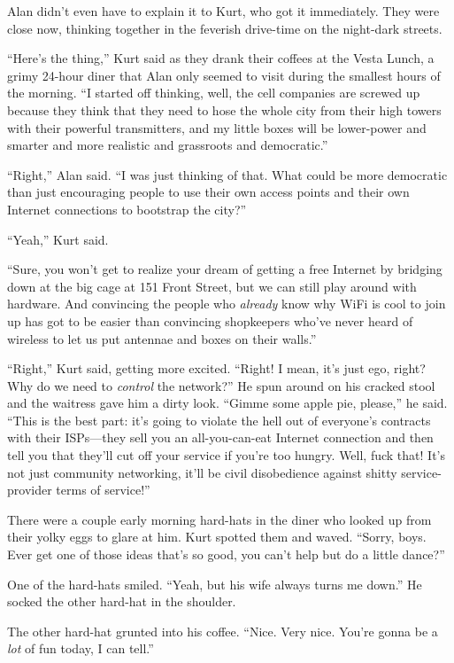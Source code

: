 Alan didn't even have to explain it to Kurt, who got it immediately. 
They were close now, thinking together in the feverish drive-time on
the night-dark streets.

``Here's the thing,'' Kurt said as they drank their coffees at the
Vesta Lunch, a grimy 24-hour diner that Alan only seemed to visit
during the smallest hours of the morning.  ``I started off thinking,
well, the cell companies are screwed up because they think that they
need to hose the whole city from their high towers with their powerful
transmitters, and my little boxes will be lower-power and smarter and
more realistic and grassroots and democratic.''

``Right,'' Alan said.  ``I was just thinking of that.  What could be
more democratic than just encouraging people to use their own access
points and their own Internet connections to bootstrap the city?''

``Yeah,'' Kurt said.

``Sure, you won't get to realize your dream of getting a free Internet
by bridging down at the big cage at 151 Front Street, but we can still
play around with hardware.  And convincing the people who
\textit{already} know why WiFi is cool to join up has got to be easier
than convincing shopkeepers who've never heard of wireless to let us
put antennae and boxes on their walls.''

``Right,'' Kurt said, getting more excited.  ``Right!  I mean, it's
just ego, right?  Why do we need to \textit{control} the network?'' He
spun around on his cracked stool and the waitress gave him a dirty
look.  ``Gimme some apple pie, please,'' he said.  ``This is the best
part:  it's going to violate the hell out of everyone's contracts with
their ISPs---they sell you an all-you-can-eat Internet connection and
then tell you that they'll cut off your service if you're too hungry. 
Well, fuck that!  It's not just community networking, it'll be civil
disobedience against shitty service-provider terms of service!''

There were a couple early morning hard-hats in the diner who looked up
from their yolky eggs to glare at him.  Kurt spotted them and waved. 
``Sorry, boys.  Ever get one of those ideas that's so good, you can't
help but do a little dance?''

One of the hard-hats smiled.  ``Yeah, but his wife always turns me
down.'' He socked the other hard-hat in the shoulder.

The other hard-hat grunted into his coffee.  ``Nice.  Very nice. 
You're gonna be a \textit{lot} of fun today, I can tell.''


